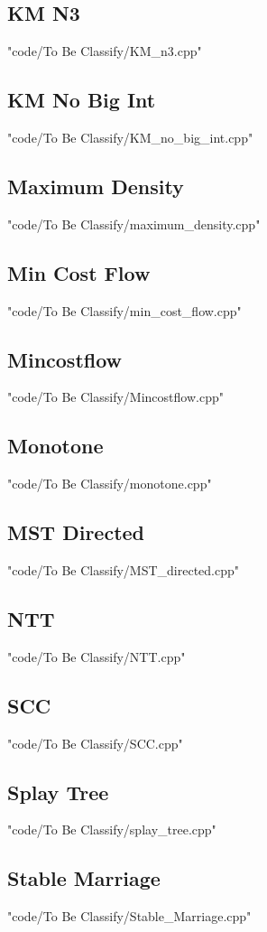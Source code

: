 \documentclass [landscape,8pt,a4paper,twocolumn]{article}
\begin{document}
\subsection{KM N3}
 {"code/To Be Classify/KM_n3.cpp"}
\subsection{KM No Big Int}
 {"code/To Be Classify/KM_no_big_int.cpp"}
\subsection{Maximum Density}
 {"code/To Be Classify/maximum_density.cpp"}
\subsection{Min Cost Flow}
 {"code/To Be Classify/min_cost_flow.cpp"}
\subsection{Mincostflow}
 {"code/To Be Classify/Mincostflow.cpp"}
\subsection{Monotone}
 {"code/To Be Classify/monotone.cpp"}
\subsection{MST Directed}
 {"code/To Be Classify/MST_directed.cpp"}
\subsection{NTT}
 {"code/To Be Classify/NTT.cpp"}
\subsection{SCC}
 {"code/To Be Classify/SCC.cpp"}
\subsection{Splay Tree}
 {"code/To Be Classify/splay_tree.cpp"}
\subsection{Stable Marriage}
 {"code/To Be Classify/Stable_Marriage.cpp"}
\end{document}
